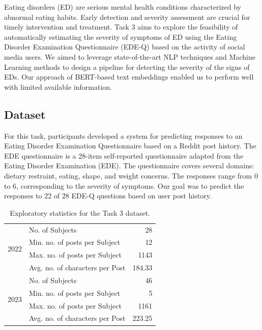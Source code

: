 \documentclass[]{style/ceurart}
\begin{document}
Eating disorders (ED) are serious mental health conditions characterized by abnormal eating habits.
Early detection and severity assessment are crucial for timely intervention and treatment.
Task 3 aims to explore the feasibility of automatically estimating the severity of symptoms of ED using the Eating Disorder Examination Questionnaire (EDE-Q) based on the activity of social media users.
We aimed to leverage state-of-the-art NLP techniques and Machine Learning methods to design a pipeline for detecting the severity of the signs of EDs.
Our approach of BERT-based \cite{devlin_bert_2019} text embeddings enabled us to perform well with limited available information.

\subsection{Dataset}

For this task, participants developed a system for predicting responses to an Eating Disorder Examination Questionnaire based on a Reddit post history.
The EDE questionnaire is a 28-item self-reported questionnaire adapted from the Eating Disorder Examination (EDE).
The questionnaire covers several domains: dietary restraint, eating, shape, and weight concerns.
The responses range from 0 to 6, corresponding to the severity of symptoms.
Our goal was to predict the responses to 22 of 28 EDE-Q questions based on user post history.


\begin{table}[h!]
\centering
\caption{Exploratory statistics for the Task 3 dataset.}
\begin{tabular}{|c|l|r|}
\hline
\multirow{4}{*}{2022} & No. of Subjects                 & 28     \\ \cline{2-3}
                      & Min. no. of posts per Subject   & 12     \\ \cline{2-3}
                      & Max. no. of posts per Subject   & 1143   \\ \cline{2-3}
                      & Avg. no. of characters per Post & 184.33 \\ \hline
\multirow{4}{*}{2023} & No. of Subjects                 & 46     \\ \cline{2-3}
                      & Min. no. of posts per Subject   & 5      \\ \cline{2-3}
                      & Max. no. of posts per Subject   & 1161   \\ \cline{2-3}
                      & Avg. no. of characters per Post & 223.25 \\ \hline
\end{tabular}
\end{table}
\end{document}
